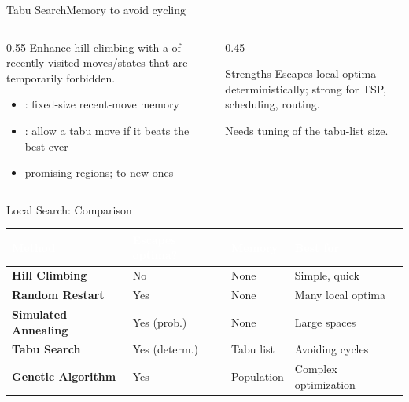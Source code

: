 \documentclass[aspectratio=169,11pt]{beamer}
\begin{document}
\begin{frame}{Tabu Search}{Memory to avoid cycling}
  \begin{columns}[T]
    \begin{column}{0.55\textwidth}
      Enhance hill climbing with a  of recently visited
      moves/states that are temporarily forbidden.
      \begin{itemize}\small
        \item {}: fixed-size recent-move memory
        \item {}: allow a tabu move if it beats the best-ever
        \item {} promising regions;  to new ones
      \end{itemize}
    \end{column}
    \begin{column}{0.45\textwidth}
      \begin{exampleblock}{Strengths}
        \small Escapes local optima deterministically; strong for TSP,
        scheduling, routing.
      \end{exampleblock}
      \centering\scriptsize Needs tuning of the tabu-list size.
    \end{column}
  \end{columns}
\end{frame}

\begin{frame}{Local Search: Comparison}{}
  \small
  \renewcommand{\arraystretch}{1.3}
  \begin{center}
  \begin{tabularx}{\textwidth}{@{}>{\bfseries}l >{\raggedright\arraybackslash}X >{\raggedright\arraybackslash}X >{\raggedright\arraybackslash}X@{}}
    \toprule
    \rowcolor{PrimaryDark}
    \textcolor{white}{Method} & \textcolor{white}{Escapes optima?} &
    \textcolor{white}{Memory} & \textcolor{white}{Best for} \\
    \midrule
    Hill Climbing & No & None & Simple, quick \\
    \rowcolor{PrimaryLight!25}
    Random Restart & Yes & None & Many local optima \\
    Simulated Annealing & Yes (prob.) & None & Large spaces \\
    \rowcolor{PrimaryLight!25}
    Tabu Search & Yes (determ.) & Tabu list & Avoiding cycles \\
    Genetic Algorithm & Yes & Population & Complex optimization \\
    \bottomrule
  \end{tabularx}
  \end{center}
\end{frame}
\end{document}
